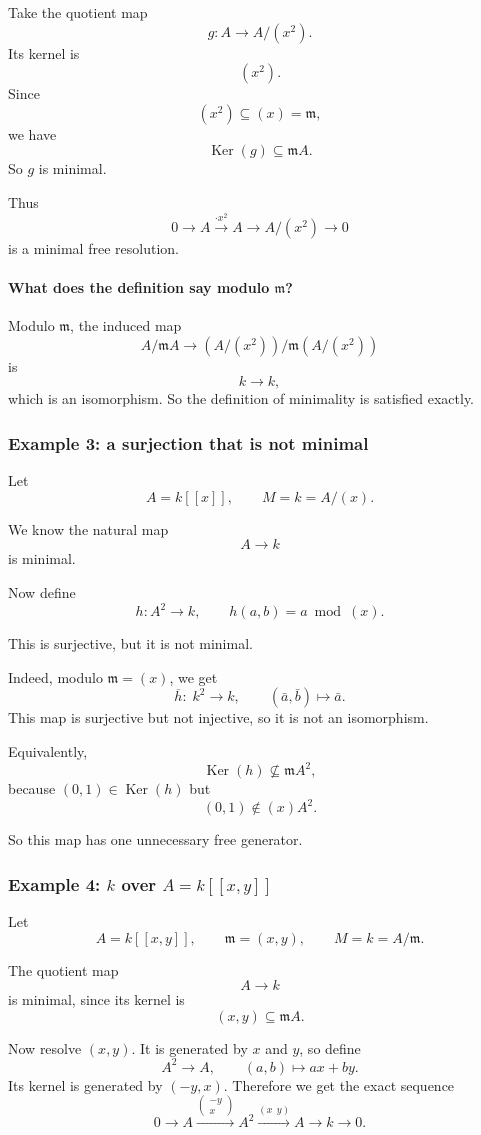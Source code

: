 \documentclass[12pt,a4paper]{article}
\theoremstyle{notespace}
\DeclareMathOperator{\Ker}{Ker}
\newcommand{\m}{\mathfrak m}
\begin{document}
Take the quotient map
\[
g:A\to A/(x^2).
\]
Its kernel is
\[
(x^2).
\]
Since
\[
(x^2)\subseteq (x)=\m,
\]
we have
\[
\Ker(g)\subseteq \m A.
\]
So \(g\) is minimal.

Thus
\[
0\to A \xrightarrow{\cdot x^2} A \to A/(x^2)\to 0
\]
is a minimal free resolution.

\paragraph{What does the definition say modulo \(\m\)?}

Modulo \(\m\), the induced map
\[
A/\m A \to (A/(x^2))/\m (A/(x^2))
\]
is
\[
k \to k,
\]
which is an isomorphism. So the definition of minimality is satisfied exactly.

\subsubsection{Example 3: a surjection that is not minimal}

Let
\[
A=k[[x]],\qquad M=k=A/(x).
\]

We know the natural map
\[
A\to k
\]
is minimal.

Now define
\[
h:A^2\to k,\qquad h(a,b)=a \bmod (x).
\]

This is surjective, but it is not minimal.

Indeed, modulo \(\m=(x)\), we get
\[
\overline h:\; k^2\to k,\qquad (\bar a,\bar b)\mapsto \bar a.
\]
This map is surjective but not injective, so it is not an isomorphism.

Equivalently,
\[
\Ker(h)\not\subseteq \m A^2,
\]
because \((0,1)\in \Ker(h)\) but
\[
(0,1)\notin (x)A^2.
\]

So this map has one unnecessary free generator.

\subsubsection{Example 4: \(k\) over \(A=k[[x,y]]\)}

Let
\[
A=k[[x,y]],\qquad \m=(x,y),\qquad M=k=A/\m.
\]

The quotient map
\[
A\to k
\]
is minimal, since its kernel is
\[
(x,y)\subseteq \m A.
\]

Now resolve \((x,y)\). It is generated by \(x\) and \(y\), so define
\[
A^2\to A,\qquad (a,b)\mapsto ax+by.
\]
Its kernel is generated by \((-y,x)\). Therefore we get the exact sequence
\[
0\to A \xrightarrow{\begin{pmatrix}-y\\x\end{pmatrix}} A^2 \xrightarrow{(x\ \ y)} A \to k \to 0.
\]
\end{document}
